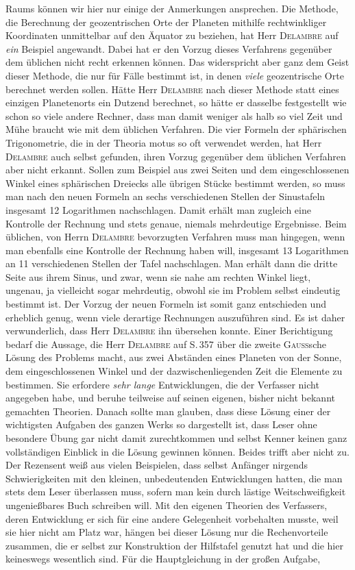 Raums können wir hier nur einige der Anmerkungen ansprechen. Die Methode, die Berechnung der geozentrischen Orte der Planeten mithilfe rechtwinkliger Koordinaten unmittelbar auf den Äquator zu beziehen, hat Herr \textsc{Delambre} auf \emph{ein} Beispiel angewandt. Dabei hat er den Vorzug dieses Verfahrens gegenüber dem üblichen nicht recht erkennen können. Das widerspricht aber ganz dem Geist dieser Methode, die nur für Fälle bestimmt ist, in denen \emph{viele} geozentrische Orte berechnet werden sollen. Hätte Herr \textsc{Delambre} nach dieser Methode statt eines einzigen Planetenorts ein Dutzend berechnet, so hätte er dasselbe festgestellt wie schon so viele andere Rechner, dass man damit weniger als halb so viel Zeit und Mühe braucht wie mit dem üblichen Verfahren. Die vier Formeln der sphärischen Trigonometrie, die in der Theoria motus so oft verwendet werden, hat Herr \textsc{Delambre} auch selbst gefunden, ihren Vorzug gegenüber dem üblichen Verfahren aber nicht erkannt. Sollen zum Beispiel aus zwei Seiten und dem eingeschlossenen Winkel eines sphärischen Dreiecks alle übrigen Stücke bestimmt werden, so muss man nach den neuen Formeln an sechs verschiedenen Stellen der Sinustafeln insgesamt 12 Logarithmen nachschlagen. Damit erhält man zugleich eine Kontrolle der Rechnung und stets genaue, niemals mehrdeutige Ergebnisse. Beim üblichen, von Herrn \textsc{Delambre} bevorzugten Verfahren muss man hingegen, wenn man ebenfalls eine Kontrolle der Rechnung haben will, insgesamt 13 Logarithmen an 11 verschiedenen Stellen der Tafel nachschlagen. Man erhält dann die dritte Seite aus ihrem Sinus, und zwar, wenn sie nahe am rechten Winkel liegt, ungenau, ja vielleicht sogar mehrdeutig, obwohl sie im Problem selbst eindeutig bestimmt ist. Der Vorzug der neuen Formeln ist somit ganz entschieden und erheblich genug, wenn viele derartige Rechnungen auszuführen sind. Es ist daher verwunderlich, dass Herr \textsc{Delambre} ihn übersehen konnte. Einer Berichtigung bedarf die Aussage, die Herr \textsc{Delambre} auf S.\,357 über die zweite \textsc{Gauss}sche Lösung des Problems macht, aus zwei Abständen eines Planeten von der Sonne, dem eingeschlossenen Winkel und der dazwischenliegenden Zeit die Elemente zu bestimmen. Sie erfordere \emph{sehr lange} Entwicklungen, die der Verfasser nicht angegeben habe, und beruhe teilweise auf seinen eigenen, bisher nicht bekannt gemachten Theorien. Danach sollte man glauben, dass diese Lösung einer der wichtigsten Aufgaben des ganzen Werks so dargestellt ist, dass Leser ohne besondere Übung gar nicht damit zurechtkommen und selbst Kenner keinen ganz vollständigen Einblick in die Lösung gewinnen können. Beides trifft aber nicht zu. Der Rezensent weiß aus vielen Beispielen, dass selbst Anfänger nirgends Schwierigkeiten mit den kleinen, unbedeutenden Entwicklungen hatten, die man stets dem Leser überlassen muss, sofern man kein durch lästige Weitschweifigkeit ungenießbares Buch schreiben will. Mit den eigenen Theorien des Verfassers, deren Entwicklung er sich für eine andere Gelegenheit vorbehalten musste, weil sie hier nicht am Platz war, hängen bei dieser Lösung nur die Rechenvorteile zusammen, die er selbst zur Konstruktion der Hilfstafel genutzt hat und die hier keineswegs wesentlich sind. Für die Hauptgleichung in der großen Aufgabe, 